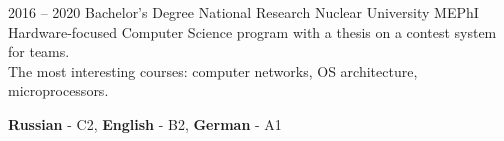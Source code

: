 \documentclass[9pt]{template}
\begin{document}

\begin{entrylist}
	\entry
	{2016 -- 2020}
	{Bachelor's Degree}
	{National Research Nuclear University MEPhI}
	{Hardware-focused Computer Science program with a thesis on a contest system for teams.\\ 
	The most interesting courses: computer networks, OS architecture, microprocessors.}
\end{entrylist}


\begin{minipage}[t]{0.6\textwidth}
	\vspace{-\baselineskip}
	
		
	\textbf{Russian} - C2, \textbf{English} - B2, \textbf{German} - A1
\end{minipage}


\end{document}
